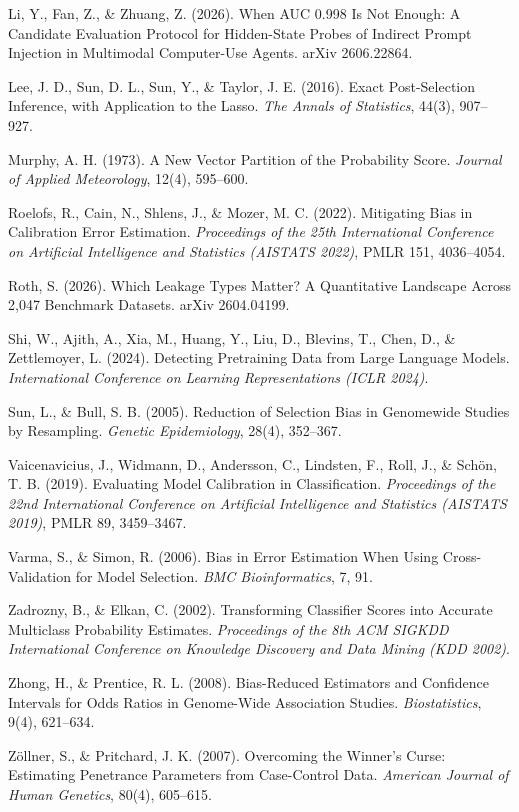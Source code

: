 \documentclass{article}
\begin{document}
Li, Y., Fan, Z., \& Zhuang, Z. (2026). When AUC 0.998 Is Not Enough: A
Candidate Evaluation Protocol for Hidden-State Probes of Indirect Prompt
Injection in Multimodal Computer-Use Agents. arXiv 2606.22864.

Lee, J. D., Sun, D. L., Sun, Y., \& Taylor, J. E. (2016). Exact
Post-Selection Inference, with Application to the Lasso. \emph{The Annals of
Statistics}, 44(3), 907--927.

Murphy, A. H. (1973). A New Vector Partition of the Probability Score.
\emph{Journal of Applied Meteorology}, 12(4), 595--600.

Roelofs, R., Cain, N., Shlens, J., \& Mozer, M. C. (2022). Mitigating Bias in
Calibration Error Estimation. \emph{Proceedings of the 25th International
Conference on Artificial Intelligence and Statistics (AISTATS 2022)},
PMLR 151, 4036--4054.

Roth, S. (2026). Which Leakage Types Matter? A Quantitative Landscape Across
2,047 Benchmark Datasets. arXiv 2604.04199.

Shi, W., Ajith, A., Xia, M., Huang, Y., Liu, D., Blevins, T., Chen, D., \&
Zettlemoyer, L. (2024). Detecting Pretraining Data from Large Language
Models. \emph{International Conference on Learning Representations (ICLR 2024)}.

Sun, L., \& Bull, S. B. (2005). Reduction of Selection Bias in Genomewide
Studies by Resampling. \emph{Genetic Epidemiology}, 28(4), 352--367.

Vaicenavicius, J., Widmann, D., Andersson, C., Lindsten, F., Roll, J., \&
Sch\"on, T. B. (2019). Evaluating Model Calibration in Classification.
\emph{Proceedings of the 22nd International Conference on Artificial
Intelligence and Statistics (AISTATS 2019)}, PMLR 89, 3459--3467.

Varma, S., \& Simon, R. (2006). Bias in Error Estimation When Using
Cross-Validation for Model Selection. \emph{BMC Bioinformatics}, 7, 91.

Zadrozny, B., \& Elkan, C. (2002). Transforming Classifier Scores into
Accurate Multiclass Probability Estimates. \emph{Proceedings of the 8th ACM
SIGKDD International Conference on Knowledge Discovery and Data Mining
(KDD 2002)}.

Zhong, H., \& Prentice, R. L. (2008). Bias-Reduced Estimators and Confidence
Intervals for Odds Ratios in Genome-Wide Association Studies.
\emph{Biostatistics}, 9(4), 621--634.

Z\"ollner, S., \& Pritchard, J. K. (2007). Overcoming the Winner's Curse:
Estimating Penetrance Parameters from Case-Control Data. \emph{American
Journal of Human Genetics}, 80(4), 605--615.
\end{document}
